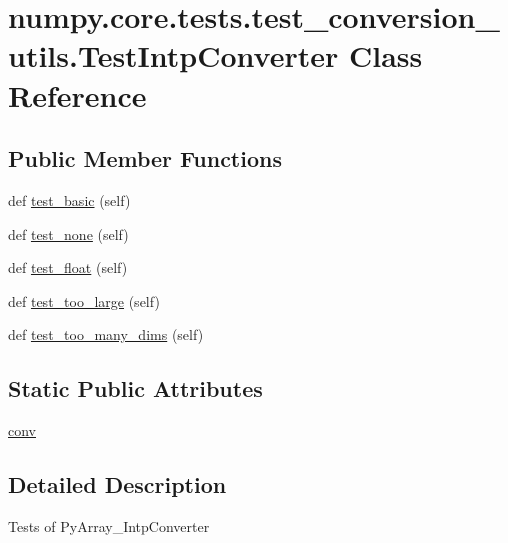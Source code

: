 \hypertarget{classnumpy_1_1core_1_1tests_1_1test__conversion__utils_1_1TestIntpConverter}{}\section{numpy.\+core.\+tests.\+test\+\_\+conversion\+\_\+utils.\+Test\+Intp\+Converter Class Reference}
\label{classnumpy_1_1core_1_1tests_1_1test__conversion__utils_1_1TestIntpConverter}
\subsection*{Public Member Functions}
\begin{DoxyCompactItemize}
\item 
def \hyperlink{classnumpy_1_1core_1_1tests_1_1test__conversion__utils_1_1TestIntpConverter_a75b6f04532efc009d32b2884171bbb84}{test\+\_\+basic} (self)
\item 
def \hyperlink{classnumpy_1_1core_1_1tests_1_1test__conversion__utils_1_1TestIntpConverter_ac5d1da5a94e74380bd9f0b028f668f15}{test\+\_\+none} (self)
\item 
def \hyperlink{classnumpy_1_1core_1_1tests_1_1test__conversion__utils_1_1TestIntpConverter_a9224f0a468dbb512ce632c629c8f4bf5}{test\+\_\+float} (self)
\item 
def \hyperlink{classnumpy_1_1core_1_1tests_1_1test__conversion__utils_1_1TestIntpConverter_a08bf35039bdc4a7bfe70db3c43072830}{test\+\_\+too\+\_\+large} (self)
\item 
def \hyperlink{classnumpy_1_1core_1_1tests_1_1test__conversion__utils_1_1TestIntpConverter_a9cb0431c2c79a8a2f8d9a28e0da16a6b}{test\+\_\+too\+\_\+many\+\_\+dims} (self)
\end{DoxyCompactItemize}
\subsection*{Static Public Attributes}
\begin{DoxyCompactItemize}
\item 
\hyperlink{classnumpy_1_1core_1_1tests_1_1test__conversion__utils_1_1TestIntpConverter_a13ddaa99d8b9df5be9ca0a98954758c1}{conv}
\end{DoxyCompactItemize}


\subsection{Detailed Description}
\begin{DoxyVerb}Tests of PyArray_IntpConverter \end{DoxyVerb}
 

